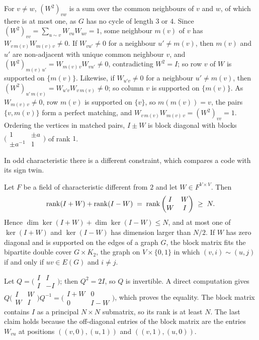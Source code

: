 \begin{informalproof}
For $v\ne w$, $(W^2)_{vw}$ is a sum over the common neighbours of $v$ and $w$, of which there is at most one, as $G$
has no cycle of length $3$ or $4$. Since $(W^2)_{vv}=\sum_{u\sim v}W_{vu}W_{uv}=1$, some neighbour $m(v)$ of $v$ has
$W_{v\,m(v)}W_{m(v)\,v}\ne0$. If $W_{vu'}\ne0$ for a neighbour $u'\ne m(v)$, then $m(v)$ and $u'$ are non-adjacent with
unique common neighbour $v$, and $(W^2)_{m(v)\,u'}=W_{m(v)\,v}W_{vu'}\ne0$, contradicting $W^2=I$; so row $v$ of $W$ is
supported on $\{m(v)\}$. Likewise, if $W_{u'v}\ne0$ for a neighbour $u'\ne m(v)$, then
$(W^2)_{u'\,m(v)}=W_{u'v}W_{v\,m(v)}\ne0$; so column $v$ is supported on $\{m(v)\}$. As $W_{m(v)\,v}\ne0$, row $m(v)$ is
supported on $\{v\}$, so $m(m(v))=v$, the pairs $\{v,m(v)\}$ form a perfect matching, and
$W_{v\,m(v)}W_{m(v)\,v}=(W^2)_{vv}=1$. Ordering the vertices in matched pairs, $I\pm W$ is block diagonal with blocks
$\bigl(\begin{smallmatrix}1&\pm a\\\pm a^{-1}&1\end{smallmatrix}\bigr)$ of rank $1$.
\end{informalproof}

In odd characteristic there is a different constraint, which compares a code with its sign twin.

\begin{proposition}\label{prop:oddchar}
\notformalized
Let $F$ be a field of characteristic different from $2$ and let $W\in F^{V\times V}$. Then
\[
  \operatorname{rank}(I+W)+\operatorname{rank}(I-W)\;=\;\operatorname{rank}\begin{pmatrix}I&W\\W&I\end{pmatrix}\;\ge\;N .
\]
Hence $\dim\ker(I+W)+\dim\ker(I-W)\le N$, and at most one of $\ker(I+W)$ and $\ker(I-W)$ has dimension larger than
$N/2$. If $W$ has zero diagonal and is supported on the edges of a graph $G$, the block matrix fits the bipartite double
cover $G\times K_2$, the graph on $V\times\{0,1\}$ in which $(v,i)\sim(u,j)$ if and only if $uv\in E(G)$ and $i\ne j$.
\end{proposition}

\begin{informalproof}
Let $Q=\bigl(\begin{smallmatrix}I&I\\I&-I\end{smallmatrix}\bigr)$; then $Q^2=2I$, so $Q$ is invertible. A direct
computation gives $Q\bigl(\begin{smallmatrix}I&W\\W&I\end{smallmatrix}\bigr)Q^{-1}
=\bigl(\begin{smallmatrix}I+W&0\\0&I-W\end{smallmatrix}\bigr)$, which proves the equality. The block matrix contains
$I$ as a principal $N\times N$ submatrix, so its rank is at least $N$. The last claim holds because the off-diagonal
entries of the block matrix are the entries $W_{vu}$ at positions $((v,0),(u,1))$ and $((v,1),(u,0))$.
\end{informalproof}

